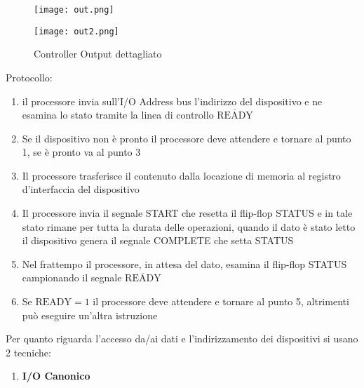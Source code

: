 \documentclass{article}
\begin{document}
\begin{itemize}
\begin{itemize}
        \begin{figure}[ht]
        \centering
        \texttt{[image: out.png]}
        \label{fig:out_contr}
        \end{figure}

        \begin{figure}[ht]
        \centering
        \texttt{[image: out2.png]}
        \label{fig:out_contr2}
        \caption{Controller Output dettagliato}
        \end{figure}

        \newpage

        Protocollo:
        \begin{enumerate}
            \item il processore invia sull’I/O Address bus l’indirizzo del dispositivo e ne esamina lo stato tramite la linea di controllo $\overline{\text{READY}}$

            \item Se il dispositivo non è pronto il processore deve attendere e tornare al punto 1,  se è pronto va al punto 3

            \item Il processore trasferisce il contenuto dalla locazione di memoria al registro d'interfaccia del dispositivo

            \item Il processore invia il segnale START che resetta il flip-flop STATUS e in tale stato rimane per tutta la durata delle operazioni, quando il dato è stato letto il dispositivo genera il segnale COMPLETE che setta STATUS

            \item Nel frattempo il processore, in attesa del dato, esamina il flip-flop STATUS campionando il segnale $\overline{\text{READY}}$

            \item Se $\text{READY}=1$ il processore deve attendere e tornare al punto 5, altrimenti può eseguire un'altra istruzione\newline

        \end{enumerate}

        Per quanto riguarda l'accesso da/ai dati e l'indirizzamento dei dispositivi si usano 2 tecniche:
            \begin{enumerate}
                \item \textbf{I/O Canonico}


\end{enumerate}
\end{itemize}
\end{itemize}
\end{document}

